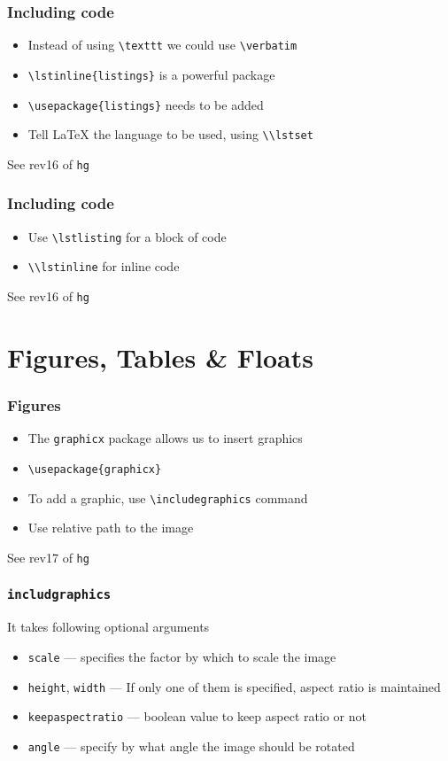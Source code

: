 \documentclass{beamer}
\newcommand{\typ}[1]{\lstinline{#1}}
\begin{document}
\begin{frame}[fragile]
  \frametitle{Including code}
  \begin{itemize}
  \item Instead of using \lstinline{\texttt} we could use
    \lstinline{\verbatim} 
  \item \lstinline+\lstinline{listings}+ is a powerful package
  \item \lstinline+\usepackage{listings}+ needs to be added 
  \item Tell {\LaTeX} the language to be used, using \typ{\\lstset}
  \end{itemize}
  \tiny See rev16 of \typ{hg}
\end{frame}

\begin{frame}[fragile]
  \frametitle{Including code}
  \begin{itemize}
  \item Use \lstinline+\lstlisting+ for a block of code
  \item \typ{\\lstinline} for inline code
  \end{itemize}
  \tiny See rev16 of \typ{hg}
\end{frame}

\section{Figures, Tables \& Floats}
\begin{frame}[fragile]
  \frametitle{Figures}
  \begin{itemize}
  \item The \typ{graphicx} package allows us to insert graphics
  \item \lstinline+\usepackage{graphicx}+
  \item To add a graphic, use \lstinline{\includegraphics} command
  \item Use relative path to the image
  \end{itemize}
  \tiny See rev17 of \typ{hg}
\end{frame}

\begin{frame}[fragile]
  \frametitle{\lstinline{includgraphics}}
  It takes following optional arguments
  \begin{itemize}
  \item \lstinline+scale+ --- specifies the factor by which to scale
    the image 
  \item \lstinline+height+, \lstinline+width+ --- If only one of them
    is specified, aspect ratio is maintained 
  \item \lstinline+keepaspectratio+ --- boolean value to keep aspect
    ratio or not 
  \item \lstinline+angle+ --- specify by what angle the image should
    be rotated 
  \end{itemize}
\end{frame}
\end{document}
